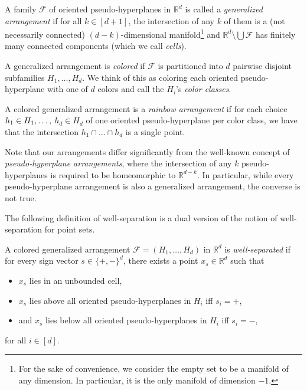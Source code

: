 \documentclass[a4paper,UKenglish,cleveref, autoref, thm-restate, nolineno]{socg-lipics-v2021}
\newcommand{\R}{\mathbb{R}}
\begin{document}
\begin{definition}
\label{def:generalized_arrangments}
A family $\mathcal{F}$ of oriented pseudo-hyperplanes in $\mathbb{R}^d$ is called a \emph{generalized arrangement} if for all $k \in [d + 1]$, the intersection of any $k$ of them is a (not necessarily connected) $(d-k)$-dimensional manifold\footnote{For the sake of convenience, we consider the empty set to be a manifold of any dimension. In particular, it is the only manifold of dimension $-1$.} and $\mathbb{R}^d\setminus\bigcup\mathcal{F}$ has finitely many connected components (which we call \emph{cells}).

A generalized arrangement is \emph{colored} if $\mathcal{F}$ is partitioned into $d$ pairwise disjoint subfamilies $H_1,\ldots,H_d$. We think of this as coloring each oriented pseudo-hyperplane with one of $d$ colors and call the $H_i$'s \emph{color classes}.

A colored generalized arrangement is a \emph{rainbow arrangement} if for each choice $h_1\in \nolinebreak H_1,\ldots,$ $h_d\in H_d$ of one oriented pseudo-hyperplane per color class, we have that the intersection $h_1\cap\ldots\cap h_d$ is a single point.
\end{definition}

Note that our arrangements differ significantly from the well-known concept of \emph{pseudo-hyperplane arrangements}, where the intersection of any $k$ pseudo-hyperplanes is required to be homeomorphic to $\R^{d - k}$. In particular, while every pseudo-hyperplane arrangement is also a generalized arrangement, the converse is not true. 

The following definition of well-separation is a dual version of the notion of well-separation for point sets.

\begin{definition}
A colored generalized arrangement $\mathcal{F}=(H_1, \dots, H_d)$ in $\mathbb{R}^d$ is \emph{well-separated} if for every sign vector $s \in \{+, -\}^d$, there exists a point $x_s \in \mathbb{R}^d$ such that 
\begin{itemize}
    \item $x_s$ lies in an unbounded cell,
    \item $x_s$ lies above all oriented pseudo-hyperplanes in $H_i$ iff $s_i = +$,
    \item and $x_s$ lies below all oriented pseudo-hyperplanes in $H_i$ iff $s_i = -$,
\end{itemize}
for all $i \in [d]$.
\end{definition}
\end{document}
